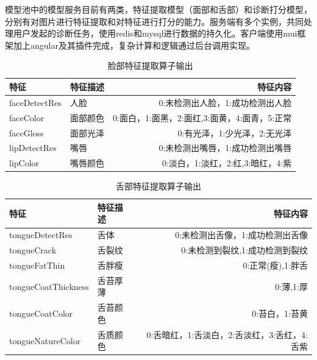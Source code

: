 模型池中的模型服务目前有两类，特征提取模型（面部和舌部）和诊断打分模型，分别有对图片进行特征提取和对特征进行打分的能力。服务端有多个实例，共同处理用户发起的诊断任务，使用redis和mysql进行数据的持久化。客户端使用mui框架加上angular及其插件完成，复杂计算和逻辑通过后台调用实现。

\begin{table}[]
    \begin{tabular}{llr}
        \toprule
        特征          & 特征描述     & 特征内容 \\ 
        \midrule
        faceDetectRes & 人脸   & 0:未检测出人脸，1:成功检测出人脸  \\
        faceColor     & 面部颜色 & 0:面白，1:面黑，2:面红,3:面黄，4:面青，5:正常 \\
        faceGloss     & 面部光泽 & 0:有光泽，1:少光泽，2:无光泽\\
        lipDetectRes  & 嘴唇   & 0:未检测出嘴唇，1:成功检测出嘴唇\\
        lipColor      & 嘴唇颜色 & 0:淡白，1:淡红，2:红,3:暗红，4:紫   \\
        \bottomrule
    \end{tabular}
    \caption{脸部特征提取算子输出}
    \label{tab:face-feature}
\end{table}


\begin{table}[]
    \begin{tabular}{llr}
        \toprule
        特征 & 特征描述 & 特征内容 \\ 
        \midrule
        tongueDetectRes & 舌体 & 0:未检测出舌像，1:成功检测出舌像 \\
        tongueCrack & 舌裂纹 & 0:未检测到裂纹,1:成功检测到裂纹 \\ 
        tongueFatThin & 舌胖瘦 & 0:正常(瘦),1:胖舌 \\
        tongueCoatThickness & 舌苔厚薄 & 0:薄,1:厚 \\
        tongueCoatColor & 舌苔颜色 & 0:苔白，1:苔黄 \\
        tongueNatureColor & 舌质颜色 & 0:舌暗红，1:舌淡白，2:舌淡红，3:舌红，4:舌紫\\
        \bottomrule
    \end{tabular}
    \caption{舌部特征提取算子输出}
    \label{tab:tongue-feature}
\end{table}


